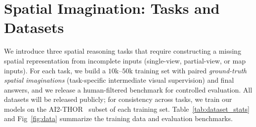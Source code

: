 \section{Spatial Imagination: Tasks and Datasets}
\label{sec:data}



We introduce three spatial reasoning tasks that require constructing a missing spatial representation from incomplete inputs (single-view, partial-view, or map inputs).
For each task, we build a $10$k--$50$k training set with paired \emph{ground-truth spatial imaginations} (task-specific intermediate visual supervision) and final answers, and we release a human-filtered benchmark for controlled evaluation. All datasets will be released publicly; for consistency across tasks, we train our models on the AI2-THOR~\cite{kolve2017ai2} subset of each training set. 
Table~\ref{tab:dataset_stats} and Fig~\ref{fig:data} summarize the training data and evaluation benchmarks.



% 


